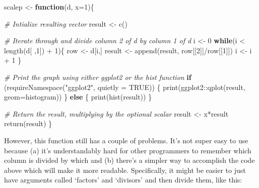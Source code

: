 \documentclass[
]{book}
\newenvironment{Shaded}{\begin{snugshade}}{\end{snugshade}}
\newcommand{\AttributeTok}[1]{\textcolor[rgb]{0.77,0.63,0.00}{#1}}
\newcommand{\CommentTok}[1]{\textcolor[rgb]{0.56,0.35,0.01}{\textit{#1}}}
\newcommand{\ConstantTok}[1]{\textcolor[rgb]{0.00,0.00,0.00}{#1}}
\newcommand{\ControlFlowTok}[1]{\textcolor[rgb]{0.13,0.29,0.53}{\textbf{#1}}}
\newcommand{\DecValTok}[1]{\textcolor[rgb]{0.00,0.00,0.81}{#1}}
\newcommand{\FunctionTok}[1]{\textcolor[rgb]{0.00,0.00,0.00}{#1}}
\newcommand{\NormalTok}[1]{#1}
\newcommand{\OtherTok}[1]{\textcolor[rgb]{0.56,0.35,0.01}{#1}}
\newcommand{\SpecialCharTok}[1]{\textcolor[rgb]{0.00,0.00,0.00}{#1}}
\newcommand{\StringTok}[1]{\textcolor[rgb]{0.31,0.60,0.02}{#1}}
\begin{document}
\begin{Shaded}
\begin{Highlighting}[]
\NormalTok{scalep }\OtherTok{\textless{}{-}} \ControlFlowTok{function}\NormalTok{(d, }\AttributeTok{x=}\DecValTok{1}\NormalTok{)\{}

  \CommentTok{\# Intialize resulting vector}
\NormalTok{  result }\OtherTok{\textless{}{-}} \FunctionTok{c}\NormalTok{()}

  \CommentTok{\# Iterate through and divide column 2 of d by column 1 of d}
\NormalTok{  i }\OtherTok{\textless{}{-}} \DecValTok{0}
  \ControlFlowTok{while}\NormalTok{(i }\SpecialCharTok{\textless{}} \FunctionTok{length}\NormalTok{(d[ ,}\DecValTok{1}\NormalTok{]) }\SpecialCharTok{+} \DecValTok{1}\NormalTok{)\{}
\NormalTok{    row }\OtherTok{\textless{}{-}}\NormalTok{ d[i,]}
\NormalTok{    result }\OtherTok{\textless{}{-}} \FunctionTok{append}\NormalTok{(result, row[[}\DecValTok{2}\NormalTok{]]}\SpecialCharTok{/}\NormalTok{row[[}\DecValTok{1}\NormalTok{]])}
\NormalTok{    i }\OtherTok{\textless{}{-}}\NormalTok{ i }\SpecialCharTok{+} \DecValTok{1}
\NormalTok{  \}}

  \CommentTok{\# Print the graph using either ggplot2 or the hist function}
  \ControlFlowTok{if}\NormalTok{ (}\FunctionTok{requireNamespace}\NormalTok{(}\StringTok{"ggplot2"}\NormalTok{, }\AttributeTok{quietly =} \ConstantTok{TRUE}\NormalTok{)) \{}
    \FunctionTok{print}\NormalTok{(ggplot2}\SpecialCharTok{::}\FunctionTok{qplot}\NormalTok{(result, }\AttributeTok{geom=}\StringTok{\textquotesingle{}histogram\textquotesingle{}}\NormalTok{))}
\NormalTok{  \} }\ControlFlowTok{else}\NormalTok{ \{}
    \FunctionTok{print}\NormalTok{(}\FunctionTok{hist}\NormalTok{(result))}
\NormalTok{  \}}

  \CommentTok{\# Return the result, multiplying by the optional scalar}
\NormalTok{  result }\OtherTok{\textless{}{-}}\NormalTok{ x}\SpecialCharTok{*}\NormalTok{result}
  \FunctionTok{return}\NormalTok{(result)}
\NormalTok{\}}
\end{Highlighting}
\end{Shaded}

However, this function still has a couple of problems. It's not super easy to use because (a) it's understandably hard for other programmers to remember which column is divided by which and (b) there's a simpler way to accomplish the code above which will make it more readable. Specifically, it might be easier to just have arguments called `factors' and `divisors' and then divide them, like this:
\end{document}
